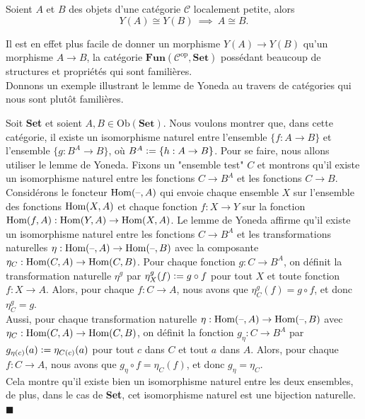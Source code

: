 \documentclass{article}
\begin{document}
\begin{lemma}{}
    Soient $A$ et $B$ des objets d'une catégorie $\mathcal C$ localement petite, alors
    $$
    Y(A)\cong Y(B)\ \implies\ A\cong B.
    $$
\end{lemma}

Il est en effet plus facile de donner un morphisme $Y(A)\to Y(B)$ qu'un morphisme $A\to B$, la catégorie $\textbf{Fun}(\mathcal C^\text{op}, \textbf{Set})$ possédant beaucoup de structures et propriétés qui sont familières.\\

Donnons un exemple illustrant le lemme de Yoneda au travers de catégories qui nous sont plutôt familières.

\begin{example}[]{}
    Soit \textbf{Set} et soient $A, B\in\text{Ob}(\textbf{Set})$. Nous voulons montrer que, dans cette catégorie, il existe un isomorphisme naturel entre l'ensemble $\{f:A\to B\}$ et l'ensemble $\{g:B^A\to B\}$, où $B^A\vcentcolon=\{h:A\to B\}$. Pour se faire, nous allons utiliser le lemme de Yoneda. Fixons un "ensemble test" $C$ et montrons qu'il existe un isomorphisme naturel entre les fonctions $C\to B^A$ et les fonctions $C\to B$.\\

    \noindent
    Considérons le foncteur $\text{Hom}(\text{--}, A)$ qui envoie chaque ensemble $X$ sur l'ensemble des fonctions $\text{Hom}(X, A)$ et chaque fonction $f:X\to Y$ sur la fonction $\text{Hom}(f, A):\text{Hom}(Y, A)\to\text{Hom}(X, A)$. Le lemme de Yoneda affirme qu'il existe un isomorphisme naturel entre les fonctions $C\to B^A$ et les transformations naturelles $\eta:\text{Hom}(\text{--}, A)\to\text{Hom}(\text{--}, B)$ avec la composante $\eta_C:\text{Hom}(C, A)\to\text{Hom}(C, B)$. Pour chaque fonction $g:C\to B^A$, on définit la transformation naturelle $\eta^g$ par $\eta^g_X(f)\vcentcolon= g\circ f$ pour tout $X$ et toute fonction $f:X\to A$. Alors, pour chaque $f:C\to A$, nous avons que $\eta^g_C(f)=g\circ f$, et donc $\eta^g_C=g$.\\

    \noindent
    Aussi, pour chaque transformation naturelle $\eta:\text{Hom}(\text{--}, A)\to\text{Hom}(\text{--}, B)$ avec $\eta_C:\text{Hom}(C, A)\to\text{Hom}(C, B)$, on définit la fonction $g_\eta:C\to B^A$ par $g_{\eta(c)}(a)\vcentcolon=\eta_{C(c)}(a)$ pour tout $c$ dans $C$ et tout $a$ dans $A$. Alors, pour chaque $f:C\to A$, nous avons que $g_\eta\circ f=\eta_C(f)$, et donc $g_\eta=\eta_C$.\\

    \noindent
    Cela montre qu'il existe bien un isomorphisme naturel entre les deux ensembles, de plus, dans le cas de \textbf{Set}, cet isomorphisme naturel est une bijection naturelle. $\blacksquare$
\end{example}
\end{document}
